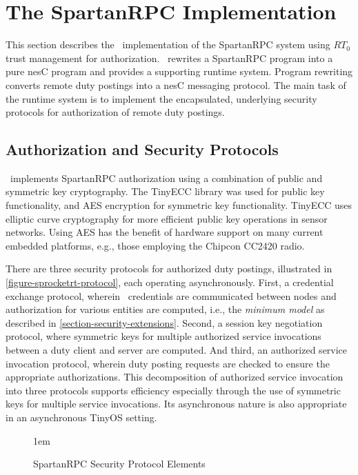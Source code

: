 \section{The SpartanRPC Implementation}
\label{section-implementation}

This section describes the \Sprocket\ implementation of the SpartanRPC system using $RT_0$
trust management for authorization. \Sprocket\ rewrites a SpartanRPC program into a pure nesC
program and provides a supporting runtime system. Program rewriting converts remote duty
postings into a nesC messaging protocol. The main task of the runtime system is to implement the
encapsulated, underlying security protocols for authorization of remote duty postings.

\subsection{Authorization and Security Protocols}
\label{section-security-protocols}
\label{section-underlying-protocols}

\Sprocket\ implements SpartanRPC authorization using a combination of public and symmetric key
cryptography. The TinyECC library \cite{Liu-Peng-TinyECC-2008} was used for public key
functionality, and AES encryption for symmetric key functionality. TinyECC uses elliptic curve
cryptography for more efficient public key operations in sensor networks. Using AES has the
benefit of hardware support on many current embedded platforms, e.g., those employing the
Chipcon CC2420 radio.

There are three security protocols for authorized duty postings, illustrated in
\autoref{figure-sprocketrt-protocol}, each operating asynchronously. First, a credential
exchange protocol, wherein \RT\ credentials are communicated between nodes and authorization for
various entities are computed, i.e., the \emph{minimum model} as described in
\autoref{section-security-extensions}. Second, a session key negotiation protocol, where
symmetric keys for multiple authorized service invocations between a duty client and server are
computed. And third, an authorized service invocation protocol, wherein duty posting requests
are checked to ensure the appropriate authorizations. This decomposition of authorized service
invocation into three protocols supports efficiency especially through the use of symmetric keys
for multiple service invocations. Its asynchronous nature is also appropriate in an asynchronous
TinyOS setting.

\begin{figure}[t]
  
  \centerline{\raise 1em\box\graph}
  \vspace{2mm}
  \caption{SpartanRPC Security Protocol Elements}
  \label{figure-sprocketrt-protocol}
\end{figure}

